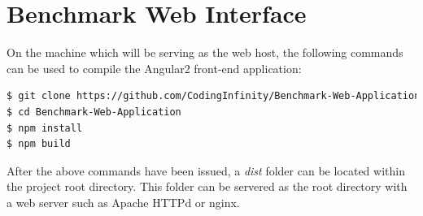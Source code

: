 \documentclass[11pt,a4paper]{article}
\begin{document}
\section{Benchmark Web Interface}
On the machine which will be serving as the web host, the following commands can
be used to compile the Angular2 front-end application:
\begin{lstlisting}[language=bash]
$ git clone https://github.com/CodingInfinity/Benchmark-Web-Application.git
$ cd Benchmark-Web-Application
$ npm install
$ npm build
\end{lstlisting}

After the above commands have been issued, a \textit{dist} folder can be located
within the project root directory. This folder can be servered as the root
directory with a web server such as Apache HTTPd or nginx.
\end{document}

